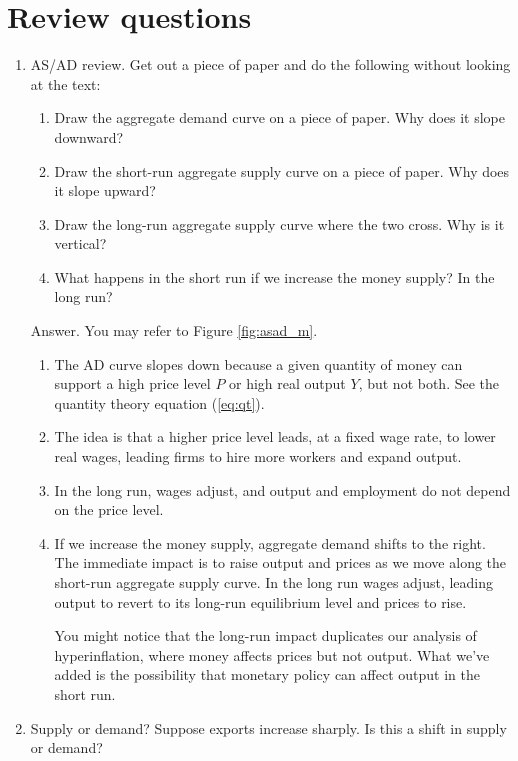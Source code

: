 \section*{Review questions}

\setlength{\leftmargini}{.5\oldleftmargini}
\begin{enumerate}
\item AS/AD review.  Get out a piece of paper and do the following
without looking at the text:
\begin{enumerate}
\item Draw the aggregate demand curve on a piece of paper.
Why does it slope downward?
\item Draw the short-run aggregate supply curve on a piece of paper.
Why does it slope upward?
\item Draw the long-run aggregate supply curve where the two cross.
Why is it vertical?
\item What happens in the short run if we increase the money supply?
In the long run?
\end{enumerate}

Answer. You may refer to Figure \ref{fig:asad_m}.
\begin{enumerate}
\item The AD curve slopes down because a given quantity of money
can support
a high price level $P$ or high real output $Y$, but not both.
See the quantity theory equation (\ref{eq:qt}).
\item The idea is that a higher price level leads, at a fixed wage rate,
to lower real wages, leading firms to hire more workers and expand output.
\item In the long run, wages adjust, and output and employment do not depend
on the price level.
\item If we increase the money supply, aggregate demand shifts to the right.
The immediate impact is to raise output and prices as we move along
the short-run aggregate supply curve.
In the long run wages adjust, leading output to revert to its long-run equilibrium
level and prices to rise.

You might notice that the long-run impact duplicates our analysis of hyperinflation,
where money affects prices but not output.
What we've added is the possibility that monetary policy can affect
output in the short run.
\end{enumerate}

\item Supply or demand?
Suppose exports increase sharply.
Is this a shift in supply or demand?


\end{enumerate}

